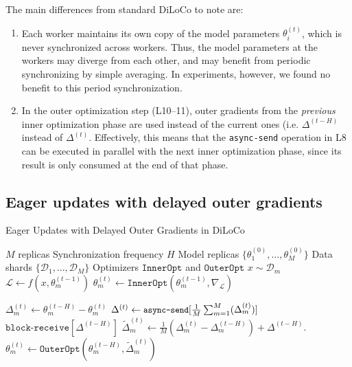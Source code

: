 The main differences from standard DiLoCo to note are: 
\begin{enumerate}
    \item Each worker maintains its own copy of the model parameters $\theta_i^{(t)}$, which is never synchronized across workers. Thus, the model parameters at the workers may diverge from each other, and may benefit from periodic synchronizing by simple averaging. In experiments, however, we found no benefit to this period synchronization.
    \item In the outer optimization step (L10--11), outer gradients from the \emph{previous} inner optimization phase are used instead of the current ones (i.e. $\Delta^{(t-H)}$ instead of $\Delta^{(t)}$. Effectively, this means that the \texttt{async-send} operation in L8 can be executed in parallel with the next inner optimization phase, since its result is only consumed at the end of that phase.
\end{enumerate}
 
 


\subsection{Eager updates with delayed outer gradients} 

\begin{algorithm}[!h]
\caption{Eager Updates with Delayed Outer Gradients in DiLoCo} \label{alg:eager-delayed}
\begin{algorithmic}[1]
\Require $M$ replicas
\Require Synchronization frequency $H$
\Require Model replicas $\{\theta^{(0)}_1, \dots, \theta^{(0)}_M\}$
\Require Data shards $\{\mathcal{D}_1, \dots, \mathcal{D}_M\}$
\Require Optimizers $\texttt{InnerOpt}$ and $\texttt{OuterOpt}$
    \State $x \sim \mathcal{D}_m$
    \State $\mathcal{L} \gets f(x, \theta_m^{(t-1)})$
    \State $\theta_m^{(t)} \gets \texttt{InnerOpt}(\theta_m^{(t-1)}, \nabla_\mathcal{L})$
    \item[]
        \State $\Delta^{(t)}_{m} \gets \theta^{(t-H)}_{m} - \theta_{m}^{(t)}$
        \State $\Delta^{(t)} \gets {\small \texttt{async-send}}[\frac{1}{M} \sum_{m=1}^M (\Delta^{(t)}_{m})]$
            \State $\texttt{block-receive}[{\Delta^{(t-H)}}]$
            \State $\tilde{\Delta}_m^{(t)} \gets \frac{1}{M} (\Delta_m^{(t)} - \Delta_m^{(t-H)}) + \Delta^{(t-H)}$.
            \State $\theta_m^{(t)} \gets \texttt{OuterOpt}(\theta_m^{(t-H)}, \tilde{\Delta}_m^{(t)})$
        \EndIf
    \EndIf
\EndFor
\EndParFor
\end{algorithmic}
\end{algorithm}


